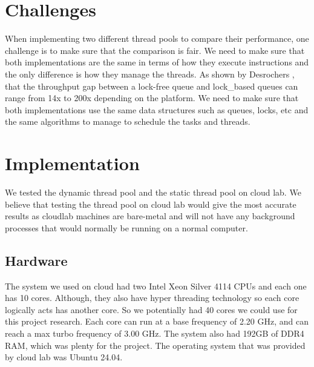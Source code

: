 \documentclass[sigconf, 10pt]{acmart}
\begin{document}

\section{Challenges}
When implementing two different thread pools to compare their performance, one challenge is to make sure that the comparison is fair.
We need to make sure that both implementations are the same in terms of how they execute instructions and the only difference is how they manage the threads.
As shown by Desrochers \cite{desrochers2014fast_lock_free_queue}, that the throughput gap between a lock-free queue and lock\_based queues can range from 14x to 200x depending on the platform.
We need to make sure that both implementations use the same data structures such as queues, locks, etc and the same algorithms to manage to schedule the tasks and threads.

\section{Implementation}\label{sec:implementation}
We tested the dynamic thread pool and the static thread pool on cloud lab. 
We believe that testing the thread pool on cloud lab would give the most accurate results as cloudlab machines are bare-metal and will not have any background processes that would normally be running on a normal computer. 

\subsection{Hardware}
The system we used on cloud had two Intel Xeon Silver 4114 CPUs and each one has 10 cores. Although, they also have hyper threading technology so each core logically acts has another core. So we potentially had 40 cores we could use for this project research.
Each core can run at a base frequency of 2.20 GHz, and can reach a max turbo frequency of 3.00 GHz. The system also had 192GB of DDR4 RAM, which was plenty for the project. 
The operating system that was provided by cloud lab was Ubuntu 24.04.
\end{document}
